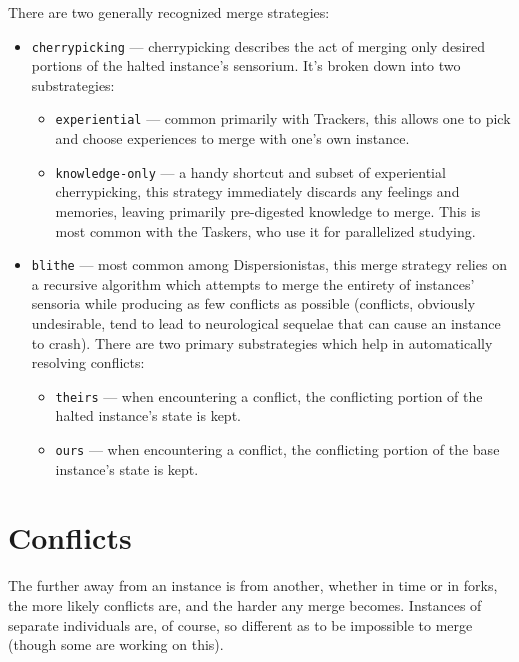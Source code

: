 There are two generally recognized merge strategies:

\begin{itemize}
\tightlist
\item
  \texttt{cherrypicking} --- cherrypicking describes the act of merging only desired portions of the halted instance's sensorium. It's broken down into two substrategies:

  \begin{itemize}
  \tightlist
  \item
    \texttt{experiential} --- common primarily with Trackers, this allows one to pick and choose experiences to merge with one's own instance.
  \item
    \texttt{knowledge-only} --- a handy shortcut and subset of experiential cherrypicking, this strategy immediately discards any feelings and memories, leaving primarily pre-digested knowledge to merge. This is most common with the Taskers, who use it for parallelized studying.
  \end{itemize}
\item
  \texttt{blithe} --- most common among Dispersionistas, this merge strategy relies on a recursive algorithm which attempts to merge the entirety of instances' sensoria while producing as few conflicts as possible (conflicts, obviously undesirable, tend to lead to neurological sequelae that can cause an instance to crash). There are two primary substrategies which help in automatically resolving conflicts:

  \begin{itemize}
  \tightlist
  \item
    \texttt{theirs} --- when encountering a conflict, the conflicting portion of the halted instance's state is kept.
  \item
    \texttt{ours} --- when encountering a conflict, the conflicting portion of the base instance's state is kept.
  \end{itemize}
\end{itemize}

\hypertarget{conflicts}{%
\section*{Conflicts}\label{conflicts}}

The further away from an instance is from another, whether in time or in forks, the more likely conflicts are, and the harder any merge becomes. Instances of separate individuals are, of course, so different as to be impossible to merge (though some are working on this).


